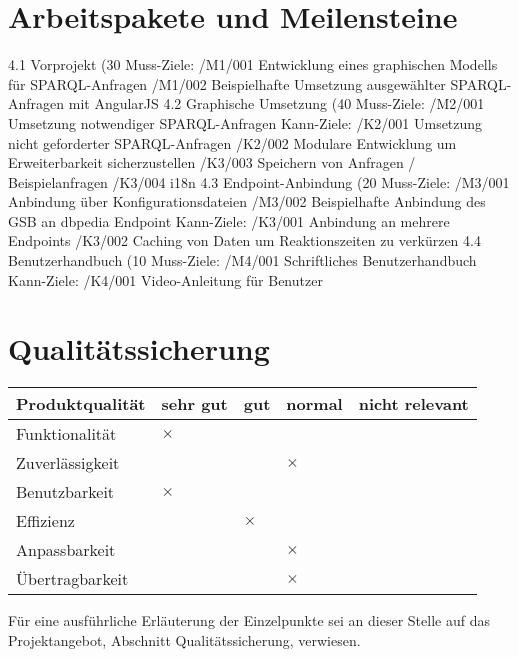 \section{Arbeitspakete und Meilensteine}
4.1 Vorprojekt (30%
Muss-Ziele: 
/M1/001 Entwicklung eines graphischen Modells für SPARQL-Anfragen
/M1/002 Beispielhafte Umsetzung ausgewählter SPARQL-Anfragen mit AngularJS
4.2 Graphische Umsetzung (40%
Muss-Ziele:
/M2/001 Umsetzung notwendiger SPARQL-Anfragen
Kann-Ziele:
/K2/001 Umsetzung nicht geforderter SPARQL-Anfragen
/K2/002 Modulare Entwicklung um Erweiterbarkeit sicherzustellen
/K3/003 Speichern von Anfragen / Beispielanfragen
/K3/004 i18n
4.3 Endpoint-Anbindung (20%
Muss-Ziele:
/M3/001 Anbindung über Konfigurationsdateien
/M3/002 Beispielhafte Anbindung des GSB an dbpedia Endpoint 
Kann-Ziele:
/K3/001 Anbindung an mehrere Endpoints
/K3/002 Caching von Daten um Reaktionszeiten zu verkürzen
4.4 Benutzerhandbuch (10%
Muss-Ziele:
/M4/001 Schriftliches Benutzerhandbuch
Kann-Ziele:
/K4/001 Video-Anleitung für Benutzer


\section{Qualitätssicherung}

\begin{table}[!h]
  \sffamily
  \begin{tabular}{l l l l l}
    \toprule
    \textbf{Produktqualität} & \textbf{sehr gut} & \textbf{gut} & \textbf{normal} & \textbf{nicht relevant} \\\midrule

    Funktionalität & $\times$ \\
    Zuverlässigkeit &&& $\times$ \\
    Benutzbarkeit &  $\times$ \\
    Effizienz  && $\times$ \\
    Anpassbarkeit &&& $\times$ \\
    Übertragbarkeit &&& $\times$ \\
    \bottomrule
  \end{tabular}
\end{table}

Für eine ausführliche Erläuterung der Einzelpunkte sei an dieser Stelle auf das Projektangebot, Abschnitt Qualitätssicherung, verwiesen.


